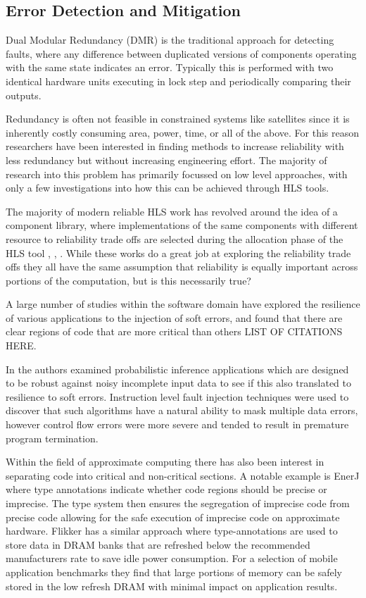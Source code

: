 \subsection{Error Detection and Mitigation}
Dual Modular Redundancy (DMR) is the traditional approach for detecting faults,
where any difference between duplicated versions of components operating with the same state indicates 
an error.
Typically this is performed with two identical hardware units executing in lock step and
periodically comparing their outputs.

Redundancy is often not feasible in constrained systems like satellites
since it is inherently costly consuming area, power, time, or all of the above.
For this reason researchers have been interested in finding methods to
increase reliability with less redundancy but without increasing engineering effort.
The majority of research into this problem has primarily focussed on low level approaches,
with only a few investigations into how this can be achieved through HLS tools.

The majority of modern reliable HLS work has revolved around the idea of a component
library, where implementations of the same components with different resource to
reliability trade offs are selected during the allocation phase of the HLS tool
\cite{tosun2005reliability}, \cite{glass2007interactive}, \cite{hara2013cost}.
While these works do a great job at exploring the reliability trade offs they
all have the same assumption that reliability is equally important across
portions of the computation, but is this necessarily true?

A large number of studies within the software domain have explored the resilience of various applications
to the injection of soft errors, and found that there are clear regions of code that
are more critical than others LIST OF CITATIONS HERE.

In \cite{wong2006soft} the authors examined probabilistic
inference applications which are designed to be robust against noisy incomplete input
data to see if this also translated to resilience to soft errors.
Instruction level fault injection techniques were used to discover that such algorithms
have a natural ability to mask multiple data errors, however control flow errors were more
severe and tended to result in premature program termination.

Within the field of approximate computing there has also been interest in separating code into
critical and non-critical sections.
A notable example is EnerJ \cite{sampson2011enerj} where type
annotations indicate whether code regions should be precise or imprecise.
The type system then ensures the segregation of imprecise code from precise code allowing for the safe execution of imprecise code on approximate hardware.
Flikker \cite{liu2012flikker} has a similar approach where type-annotations are used to store data in
DRAM banks that are refreshed below the recommended manufacturers rate to save idle power consumption.  
For a selection of mobile application benchmarks they find that large portions of memory can be safely
stored in the low refresh DRAM with minimal impact on application results.

